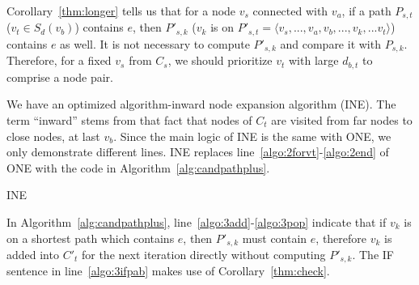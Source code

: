 Corollary~\ref{thm:longer} tells us that for a node $v_s$ connected with $v_a$, if a path $P_{s,t}$ ($v_t\in S_{d}(v_b)$) contains $e$, then $P'_{s,k}$ ($v_k$ is on $P'_{s,t}=\langle v_s,...,v_a,v_b,...,v_k,...v_t\rangle$) contains $e$ as well. It is not necessary to compute $P'_{s,k}$ and compare it with $P_{s,k}$. Therefore, for a fixed $v_s$ from $C_s$, we should prioritize $v_t$ with large $d_{b,t}$ to comprise a node pair.

We have an optimized algorithm-inward node expansion algorithm (INE). The term ``inward'' stems from that fact that nodes of $C_t$ are visited from far nodes to close nodes, at last $v_b$.
Since the main logic of INE is the same with ONE, we only demonstrate different lines. INE replaces line~\ref{algo:2forvt}-\ref{algo:2end} of ONE with the code in Algorithm~\ref{alg:candpathplus}.



\begin{algorithm}[htbp]
{\small
     \caption{{\textsc{INE}} }
    \label{alg:candpathplus}
}
\end{algorithm}

In Algorithm~\ref{alg:candpathplus}, line~\ref{algo:3add}-\ref{algo:3pop} indicate that if $v_k$ is on a shortest path which contains $e$, then $P'_{s,k}$ must contain $e$, therefore $v_k$ is added into $C'_t$ for the next iteration directly without computing $P'_{s,k}$. The IF sentence in line~\ref{algo:3ifpab} makes use of Corollary~\ref{thm:check}.



